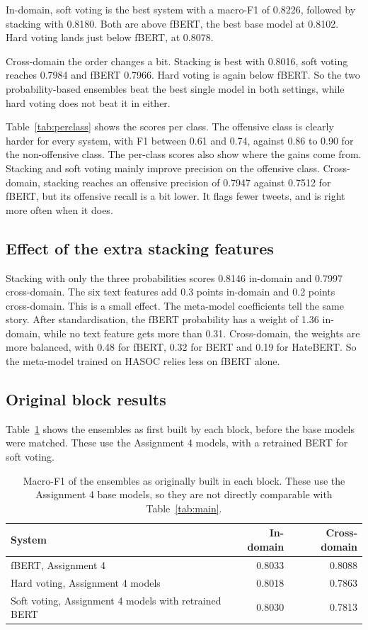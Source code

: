 \documentclass[11pt,a4paper]{article}
\begin{document}
In-domain, soft voting is the best system with a macro-F1 of 0.8226, followed by stacking with 0.8180. Both are above fBERT, the best base model at 0.8102. Hard voting lands just below fBERT, at 0.8078.

Cross-domain the order changes a bit. Stacking is best with 0.8016, soft voting reaches 0.7984 and fBERT 0.7966. Hard voting is again below fBERT. So the two probability-based ensembles beat the best single model in both settings, while hard voting does not beat it in either.

Table~\ref{tab:perclass} shows the scores per class. The offensive class is clearly harder for every system, with F1 between 0.61 and 0.74, against 0.86 to 0.90 for the non-offensive class. The per-class scores also show where the gains come from. Stacking and soft voting mainly improve precision on the offensive class. Cross-domain, stacking reaches an offensive precision of 0.7947 against 0.7512 for fBERT, but its offensive recall is a bit lower. It flags fewer tweets, and is right more often when it does.

\subsection{Effect of the extra stacking features}

Stacking with only the three probabilities scores 0.8146 in-domain and 0.7997 cross-domain. The six text features add 0.3 points in-domain and 0.2 points cross-domain. This is a small effect. The meta-model coefficients tell the same story. After standardisation, the fBERT probability has a weight of 1.36 in-domain, while no text feature gets more than 0.31. Cross-domain, the weights are more balanced, with 0.48 for fBERT, 0.32 for BERT and 0.19 for HateBERT. So the meta-model trained on HASOC relies less on fBERT alone.

\subsection{Original block results}
\label{sec:original}

Table~\ref{tab:original} shows the ensembles as first built by each block, before the base models were matched. These use the Assignment 4 models, with a retrained BERT for soft voting.

\begin{table}[H]
\centering
\caption{Macro-F1 of the ensembles as originally built in each block. These use the Assignment 4 base models, so they are not directly comparable with Table~\ref{tab:main}.}
\label{tab:original}
\begin{tabular}{lrr}
\toprule
System & In-domain & Cross-domain \\
\midrule
fBERT, Assignment 4 & 0.8033 & 0.8088 \\
Hard voting, Assignment 4 models & 0.8018 & 0.7863 \\
Soft voting, Assignment 4 models with retrained BERT & 0.8030 & 0.7813 \\
\bottomrule
\end{tabular}
\end{table}
\end{document}
